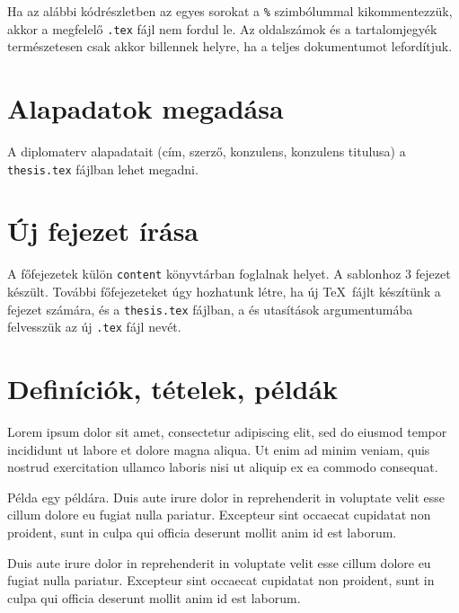 Ha az alábbi kódrészletben az egyes sorokat a \verb+%+ szimbólummal kikommentezzük, akkor a megfelelő \verb+.tex+ fájl nem fordul le. Az oldalszámok és a tartalomjegyék természetesen csak akkor billennek helyre, ha a teljes dokumentumot lefordítjuk.

\newpage
\section{Alapadatok megadása}
A diplomaterv alapadatait (cím, szerző, konzulens, konzulens titulusa) a \verb+thesis.tex+ fájlban lehet megadni.

\section{Új fejezet írása}
A főfejezetek külön \verb+content+ könyvtárban foglalnak helyet. A sablonhoz 3 fejezet készült. További főfejezeteket úgy hozhatunk létre, ha új \TeX~fájlt készítünk a fejezet számára, és a \verb+thesis.tex+ fájlban, a \verb++ és \verb++ utasítások argumentumába felvesszük az új \verb+.tex+ fájl nevét.


\section{Definíciók, tételek, példák}

\begin{definition}
Lorem ipsum dolor sit amet, consectetur adipiscing elit, sed do eiusmod tempor incididunt ut labore et dolore magna aliqua. Ut enim ad minim veniam, quis nostrud exercitation ullamco laboris nisi ut aliquip ex ea commodo consequat.
\end{definition}

\begin{example}
Példa egy példára. Duis aute irure dolor in reprehenderit in voluptate velit esse cillum dolore eu fugiat nulla pariatur. Excepteur sint occaecat cupidatat non proident, sunt in culpa qui officia deserunt mollit anim id est laborum.
\end{example}

\begin{theorem}
Duis aute irure dolor in reprehenderit in voluptate velit esse cillum dolore eu fugiat nulla pariatur. Excepteur sint occaecat cupidatat non proident, sunt in culpa qui officia deserunt mollit anim id est laborum.
\end{theorem}


